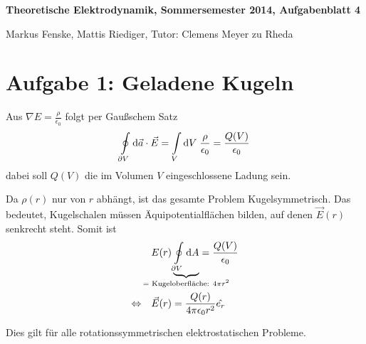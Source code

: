 \documentclass[a4paper,german,12pt,smallheadings]{scrartcl}
\begin{document}
\allowdisplaybreaks %
\begin{center}
\bfseries %
\sffamily %
\vspace{-40pt}
Theoretische Elektrodynamik, Sommersemester 2014, Aufgabenblatt 4

Markus Fenske, Mattis Riediger, Tutor: Clemens Meyer zu Rheda
\vspace{-10pt}
\end{center}

\section*{Aufgabe 1: Geladene Kugeln}
Aus $\nabla E = \frac{\rho}{\epsilon_0}$ folgt per Gaußschem Satz
\begin{equation}
  \oint\limits_{\partial V} \dif \vec{a} \cdot \vec{E} = \int\limits_{V} \dif V \; \frac{\rho}{\epsilon_0} = \frac{Q(V)}{\epsilon_0}
\end{equation}
dabei soll $Q(V)$ die im Volumen $V$ eingeschlossene Ladung sein.

Da $\rho(r)$ nur von $r$ abhängt, ist das gesamte Problem Kugelsymmetrisch.
Das bedeutet, Kugelschalen müssen Äquipotentialflächen bilden, auf denen
$\vec{E}(r)$ senkrecht steht. Somit ist
\begin{align}
  &E(r) \underbrace{\oint\limits_{\partial V} \dif A}_{\mathclap{= \text{ Kugeloberfläche: } 4 \pi r^2}} = \frac{Q(V)}{\epsilon_0} \\
  \Leftrightarrow\quad
  & \vec{E}(r) = \frac{Q(r)}{4 \pi \epsilon_0 r^2} \hat{e_r}
\end{align}

Dies gilt für alle rotationssymmetrischen elektrostatischen Probleme.
\end{document}
